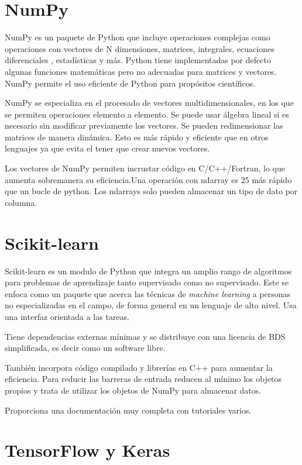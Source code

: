 \section{NumPy}\label{sect:numpy}

NumPy\cite{bressert2012scipy} es un paquete de Python que incluye operaciones complejas como operaciones con vectores de N dimensiones, matrices, integrales, ecuaciones diferenciales , estadísticas y más. Python tiene implementadas por defecto algunas funciones matemáticas pero no adecuadas para matrices y vectores. NumPy permite el uso eficiente de Python para propósitos científicos.

NumPy se especializa en el procesado de vectores multidimensionales, en los que se permiten operaciones elemento a elemento. Se puede usar álgebra lineal si es necesario sin modificar previamente los vectores. Se pueden redimensionar las matrices de manera dinámica. Esto es más rápido y eficiente que en otros lenguajes ya que evita el tener que crear nuevos vectores. 

Los vectores de NumPy permiten incrustar código en C/C++/Fortran, lo que aumenta sobremanera su eficiencia.Una operación con ndarray es 25 más rápido que un bucle de python. Los ndarrays solo pueden almacenar un tipo de dato por columna. 
 
\section{Scikit-learn}\label{sect:scikit}

Scikit-learn es un modulo de Python que integra un amplio rango de algoritmos para problemas de aprendizaje tanto supervisado como no supervisado. Este se enfoca como un paquete que acerca las técnicas de \textit{machine learning} a personas no especializadas en el campo, de forma general en un lenguaje de alto nivel.  Usa una interfaz orientada a las tareas.

Tiene dependencias externas mínimas y se distribuye  con una licencia de BDS simplificada, es decir como un software libre.

También incorpora código compilado y librerías en C++ para aumentar la eficiencia. Para reducir las barreras de entrada reducen al mínimo los objetos propios y trata de utilizar los objetos de NumPy para almacenar datos.

Proporciona una documentación muy completa con tutoriales varios.

\section{TensorFlow y Keras}


